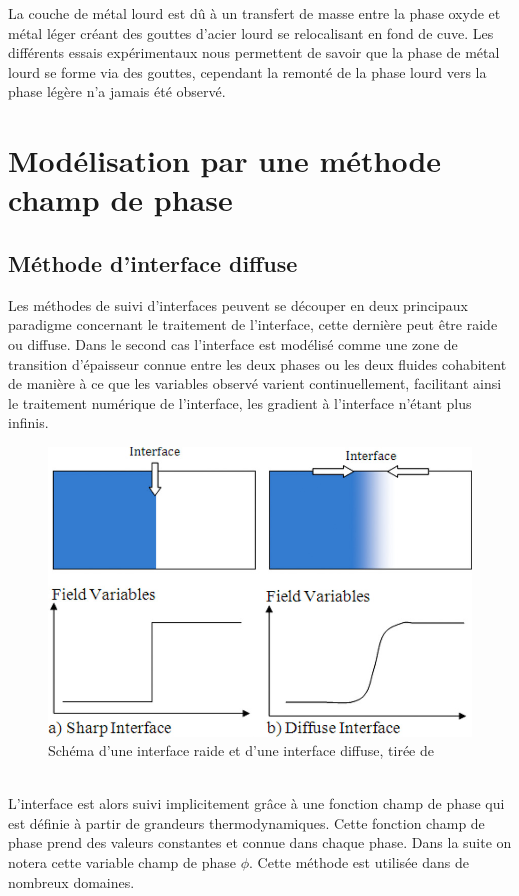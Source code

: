 \documentclass[a4paper,11pt,fleqn]{report}    %
\begin{document}
La couche de métal lourd est dû à un transfert de masse entre la phase oxyde et métal léger créant des gouttes d'acier lourd se relocalisant en fond de cuve. Les différents essais expérimentaux nous permettent de savoir que la phase de métal lourd se forme via des gouttes, cependant la remonté de la phase lourd vers la phase légère n'a jamais été observé.





\chapter{Modélisation par une méthode champ de phase}
\section{Méthode d'interface diffuse}

Les méthodes de suivi d'interfaces peuvent se découper en deux principaux paradigme concernant le traitement de l'interface, cette dernière peut être raide ou diffuse. Dans le second cas l'interface est modélisé comme une zone de transition d'épaisseur connue entre les deux phases ou les deux fluides cohabitent de manière à ce que les variables observé varient continuellement, facilitant ainsi le traitement numérique de l'interface, les gradient à l'interface n'étant plus infinis.
\begin{figure}[h!]
	\centering
	\includegraphics[width=0.3\linewidth]{figure/diffuse_interface}
	\caption[Schéma d'une interface raide et d'une interface diffuse]{Schéma d'une interface raide et d'une interface diffuse, tirée de \cite{samkhaniani_evaluation_2017}}
	\label{fig:diffuseinterface}
\end{figure} \\
L'interface est alors suivi implicitement grâce à une fonction champ de phase qui est définie à partir de grandeurs thermodynamiques. Cette fonction champ de phase prend des valeurs constantes et connue dans chaque phase. Dans la suite on notera cette variable champ de phase $\phi$. Cette méthode est utilisée dans de nombreux domaines.
\end{document}
